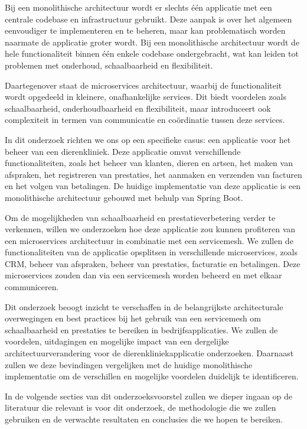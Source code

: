 \documentclass{hogent-article}
\begin{document}
Bij een monolithische architectuur wordt er slechts één applicatie met een centrale codebase en infrastructuur gebruikt. Deze aanpak is over het algemeen eenvoudiger te implementeren en te beheren, maar kan problematisch worden naarmate de applicatie groter wordt. Bij een monolithische architectuur wordt de hele functionaliteit binnen één enkele codebase ondergebracht, wat kan leiden tot problemen met onderhoud, schaalbaarheid en flexibiliteit.


Daartegenover staat de microservices architectuur, waarbij de functionaliteit wordt opgedeeld in kleinere, onafhankelijke services. Dit biedt voordelen zoals schaalbaarheid, onderhoudbaarheid en flexibiliteit, maar introduceert ook complexiteit in termen van communicatie en coördinatie tussen deze services.


In dit onderzoek richten we ons op een specifieke casus: een applicatie voor het beheer van een dierenkliniek. Deze applicatie omvat verschillende functionaliteiten, zoals het beheer van klanten, dieren en artsen, het maken van afspraken, het registreren van prestaties, het aanmaken en verzenden van facturen en het volgen van betalingen. De huidige implementatie van deze applicatie is een monolithische architectuur gebouwd met behulp van Spring Boot.


Om de mogelijkheden van schaalbaarheid en prestatieverbetering verder te verkennen, willen we onderzoeken hoe deze applicatie zou kunnen profiteren van een microservices architectuur in combinatie met een servicemesh. We zullen de functionaliteiten van de applicatie opsplitsen in verschillende microservices, zoals CRM, beheer van afspraken, beheer van prestaties, facturatie en betalingen. Deze microservices zouden dan via een servicemesh worden beheerd en met elkaar communiceren.


Dit onderzoek beoogt inzicht te verschaffen in de belangrijkste architecturale overwegingen en best practices bij het gebruik van een servicemesh om schaalbaarheid en prestaties te bereiken in bedrijfsapplicaties. We zullen de voordelen, uitdagingen en mogelijke impact van een dergelijke architectuurverandering voor de dierenkliniekapplicatie onderzoeken. Daarnaast zullen we deze bevindingen vergelijken met de huidige monolithische implementatie om de verschillen en mogelijke voordelen duidelijk te identificeren.


In de volgende secties van dit onderzoeksvoorstel zullen we dieper ingaan op de literatuur die relevant is voor dit onderzoek, de methodologie die we zullen gebruiken en de verwachte resultaten en conclusies die we hopen te bereiken.
\end{document}
